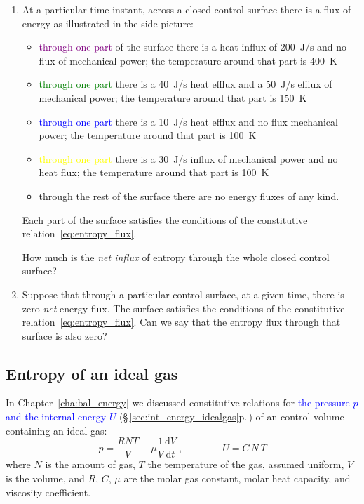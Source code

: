 \documentclass[a4paper,12pt,%
onecolumn,oneside,%
british%
]{memoir}
\newcommand*{\di}{\mathrm{d}}%
\renewcommand*{\|}[1][]{\nonscript\:#1\vert\nonscript\:\mathopen{}}
\newcommand*{\sect}{\S}%
\newcommand*{\chap}{Chapter}%
\renewcommand*{\autoref}[3][\sect\,\ref]{\textcolor{blue}{#3} {\color{blue}\scriptsize(\faIcon[regular]{eye}\;#1{#2}\;p.\,\pageref{#2})}}
\newcommand*{\yvis}{\mu} %
\newcommand*{\dt}{\di t}
\newcommand*{\yN}{N}
\newcommand*{\yU}{U}
\newcommand*{\ypr}{p} %
\newcommand*{\yT}{T}%
\begin{document}
\begin{exercise}
  \begin{enumerate}[exerc]
  \item At a particular time instant, across a closed control surface there is a flux of energy as illustrated in the side picture:
    \begin{itemize}
    \item \textcolor{purple}{through one part} of the surface there is a heat influx of \qty{200}{J/s} and no flux of mechanical power; the temperature around that part is \qty{400}{K}
    \item \textcolor{green}{through one part} there is a \qty{40}{J/s} heat efflux and a \qty{50}{J/s} efflux of mechanical power; the temperature around that part is \qty{150}{K}
    \item \textcolor{blue}{through one part} there is a  \qty{10}{J/s} heat efflux and no flux mechanical power; the temperature around that part is \qty{100}{K}
    \item \textcolor{yellow}{through one part}  there is a  \qty{30}{J/s} influx of mechanical power and no heat flux; the temperature around that part is \qty{100}{K}
    \item \textcolor{midgrey}{through the rest} of the surface there are no energy fluxes of any kind.
    \end{itemize}
    Each part of the surface satisfies the conditions of the constitutive relation~\eqref{eq:entropy_flux}.

    \smallskip

    How much is the \emph{net influx} of entropy through the whole closed control surface?

    \bigskip

  \item Suppose that through a particular control surface, at a given time, there is zero \emph{net} energy flux. The surface satisfies the conditions of the constitutive relation~\eqref{eq:entropy_flux}. Can we say that the entropy flux through that surface is also zero?
  \end{enumerate}
\end{exercise}

\subsection{Entropy of an ideal gas}
\label{sec:entropy_ideal_gas}

In \chap~\ref{cha:bal_energy} we discussed constitutive relations for \autoref{sec:int_energy_idealgas}{the pressure $\ypr$ and the internal energy $\yU$} of an control volume containing an ideal gas:
\begin{equation*}
  \ypr = \frac{R \yN \yT}{V}  - \yvis \frac{1}{V}\frac{\di V}{\dt} \ ,
  \qquad\qquad
  \yU = C\,\yN\,\yT
\end{equation*}
where $\yN$ is the amount of gas, $\yT$ the temperature of the gas, assumed uniform, $V$ is the volume, and $R$, $C$, $\yvis$ are the molar gas constant, molar heat capacity, and viscosity coefficient.
\end{document}
